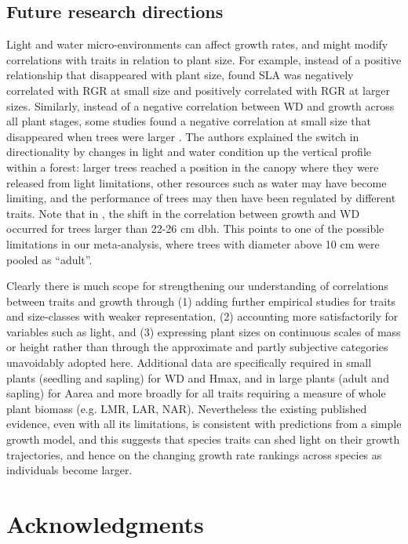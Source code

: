 \documentclass[a4paper,11pt]{article}
\begin{document}
\subsection*{Future research directions}

Light and water micro-environments can affect growth rates, and might modify correlations with traits in relation to plant size. For example, instead of a positive relationship that disappeared with plant size, \citet{Iida:2014ep} found SLA was negatively correlated with RGR at small size and positively correlated with RGR at larger sizes. Similarly, instead of a negative correlation between WD and growth across all plant stages, some studies found a negative correlation at small size that disappeared when trees were larger \citep{Iida:2014ep,Iida:2014hq}. The authors explained the switch in directionality by changes in light and water condition up the vertical profile within a forest: larger trees reached a position in the canopy where they were released from light limitations, other resources such as water may have become limiting, and the performance of trees may then have been regulated by different traits. Note that in \citet{Iida:2014hq}, the shift in the correlation between growth and WD occurred for trees larger than 22-26 cm dbh. This points to one of the possible limitations in our meta-analysis, where trees with diameter above 10 cm were pooled as ``adult''.

Clearly there is much scope for strengthening our understanding of correlations between traits and growth through (1) adding further empirical studies for traits and size-classes with weaker representation, (2) accounting more satisfactorily for variables such as light, and (3) expressing plant sizes on continuous scales of mass or height rather than through the approximate and partly subjective categories unavoidably adopted here. Additional data are specifically required in small plants (seedling and sapling) for WD and Hmax, and in large plants (adult and sapling) for Aarea and more broadly for all traits requiring a measure of whole plant biomass (e.g. LMR, LAR, NAR). Nevertheless the existing published evidence, even with all its limitations, is consistent with predictions from a simple growth model, and this suggests that species traits can shed light on their growth trajectories, and hence on the changing growth rate rankings across species as individuals become larger.

\section*{Acknowledgments}\label{Acknowledgment}
\end{document}
